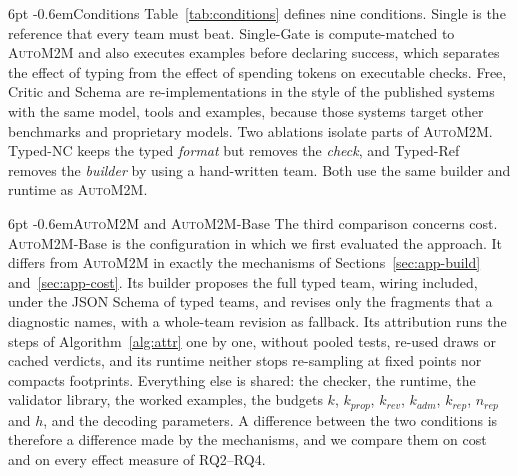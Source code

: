 \documentclass[pdflatex,sn-mathphys-num]{sn-jnl}
\makeatletter
\theoremstyle{thmstyleone}%
\theoremstyle{thmstyletwo}%
\theoremstyle{thmstylethree}%
\newcommand{\auto}{\textsc{AutoM2M}}
\renewcommand\paragraph{\@startsection{paragraph}{4}{\z@}%
  {6pt \@plus 2pt \@minus 1pt}{-0.6em}{\normalfont\normalsize\bfseries}}
\makeatother
\begin{document}
\paragraph{Conditions} Table~\ref{tab:conditions} defines nine conditions.
Single is the reference that every team must beat. Single-Gate is
compute-matched to \auto{} and also executes examples before declaring success,
which separates the effect of typing from the effect of spending tokens on
executable checks. Free, Critic and Schema are re-implementations in the style
of the published systems with the same model, tools and examples, because those
systems target other benchmarks and proprietary models. Two ablations isolate
parts of \auto{}. Typed-NC keeps the typed \emph{format} but removes the
\emph{check}, and Typed-Ref removes the \emph{builder} by using a hand-written
team. Both use the same builder and runtime as \auto{}.

\paragraph{\auto{} and \auto{}-Base} The third comparison concerns cost.
\auto{}-Base is the configuration in which we first evaluated the approach. It
differs from \auto{} in exactly the mechanisms of
Sections~\ref{sec:app-build} and~\ref{sec:app-cost}. Its builder proposes the
full typed team, wiring included, under the JSON Schema of typed teams, and
revises only the fragments that a diagnostic names, with a whole-team revision
as fallback. Its attribution runs the steps of Algorithm~\ref{alg:attr} one by
one, without pooled tests, re-used draws or cached verdicts, and its runtime
neither stops re-sampling at fixed points nor compacts footprints. Everything
else is shared: the checker, the runtime, the validator library, the worked
examples, the budgets $k$, $k_{\mathit{prop}}$, $k_{\mathit{rev}}$,
$k_{\mathit{adm}}$, $k_{\mathit{rep}}$, $n_{\mathit{rep}}$ and $h$, and the
decoding parameters. A difference between the two conditions is therefore a
difference made by the mechanisms, and we compare them on cost and on every
effect measure of RQ2--RQ4.
\end{document}
